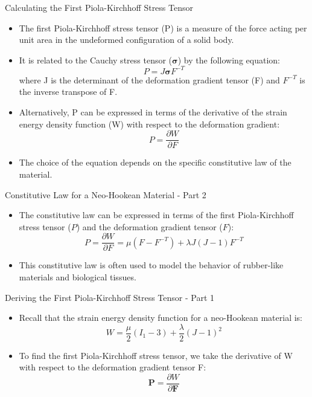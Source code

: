 \documentclass{beamer}
\begin{document}
\begin{frame}{Calculating the First Piola-Kirchhoff Stress Tensor}
\begin{itemize}
\item The first Piola-Kirchhoff stress tensor (P) is a measure of the force acting per unit area in the undeformed configuration of a solid body.
\item It is related to the Cauchy stress tensor ($\boldsymbol{\sigma}$) by the following equation:
\begin{equation*}
P = J \boldsymbol{\sigma} F^{-T}
\end{equation*}
where J is the determinant of the deformation gradient tensor (F) and $F^{-T}$ is the inverse transpose of F.
\item Alternatively, P can be expressed in terms of the derivative of the strain energy density function (W) with respect to the deformation gradient:
\begin{equation*}
P = \frac{\partial W}{\partial F}
\end{equation*}
\item The choice of the equation depends on the specific constitutive law of the material.
\end{itemize}
\end{frame}

\begin{frame}{Constitutive Law for a Neo-Hookean Material - Part 2}
\begin{itemize}
\item The constitutive law can be expressed in terms of the first Piola-Kirchhoff stress tensor ($P$) and the deformation gradient tensor ($F$):
\begin{equation*}
P = \frac{\partial W}{\partial F} = \mu (F - F^{-T}) + \lambda J (J - 1) F^{-T}
\end{equation*}
\item This constitutive law is often used to model the behavior of rubber-like materials and biological tissues.
\end{itemize}
\end{frame}

\begin{frame}{Deriving the First Piola-Kirchhoff Stress Tensor - Part 1}
\begin{itemize}
\item Recall that the strain energy density function for a neo-Hookean material is:
\begin{equation*}
W = \frac{\mu}{2} (I_1 - 3) + \frac{\lambda}{2} (J - 1)^2
\end{equation*}
\item To find the first Piola-Kirchhoff stress tensor, we take the derivative of W with respect to the deformation gradient tensor F:
\begin{equation*}
\mathbf{P} = \frac{\partial W}{\partial \mathbf{F}}
\end{equation*}
\end{itemize}
\end{frame}
\end{document}
